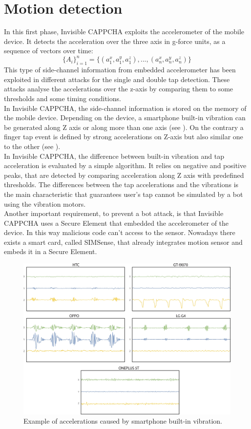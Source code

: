 \section{Motion detection}
In this first phase, Invisible CAPPCHA exploits the accelerometer of the mobile device. It detects the acceleration over the three axis in g-force units, as a sequence of vectors over time:
$$\{ A_i\}_{i=1}^{n} = \{ (a_1^x, a_1^y, a_1^z), ..., (a_n^x, a_n^y, a_n^z)\}$$
This type of side-channel information from embedded accelerometer has been exploited in different attacks for the single and double tap detection. These attacks analyse the accelerations over the z-axis by comparing them to some thresholds and some timing conditions.\\
In Invisible CAPPCHA, the side-channel information is stored on the memory of the mobile device. Depending on the device, a smartphone built-in vibration can be generated along Z axis or along more than one axis (see ). On the contrary a finger tap event is defined by strong accelerations on Z-axis but also similar one to the other (see ).\\
In Invisible CAPPCHA, the difference between built-in vibration and tap acceleration is evaluated by a simple algorithm. It relies on negative and positive peaks, that are detected by comparing acceleration along Z axis with predefined thresholds. The differences between the tap accelerations and the vibrations is the main characteristic that guarantees user's tap cannot be simulated by a bot using the vibration motors.\\
Another important requirement, to prevent a bot attack, is that Invisible CAPPCHA uses a Secure Element that embedded the accelerometer of the device. In this way malicious code can't access to the sensor. Nowadays there exists a smart card, called SIMSense, that already integrates motion sensor and embeds it in a Secure Element.\\
\begin{figure}[h]
     \centering
     \includegraphics[width=.8\linewidth]{Images/InvisibleCAPPCHA/vibration}
     \caption{\footnotesize{Example of accelerations caused by smartphone built-in vibration.}}\label{inv:vibration}
\end{figure}
